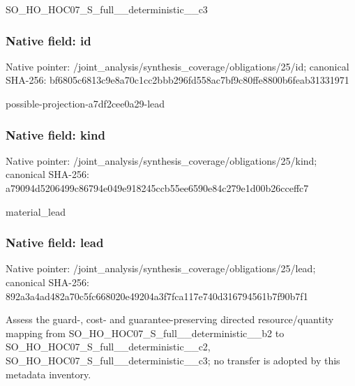 \documentclass[10pt,a4paper]{article}
\begin{document}
\begingroup\raggedright\sloppy SO\_\allowbreak{}HO\_\allowbreak{}HOC07\_\allowbreak{}S\_\allowbreak{}full\_\allowbreak{}\_\allowbreak{}deterministic\_\allowbreak{}\_\allowbreak{}c3\par\endgroup

\subsubsection{Native field: id}
Native pointer: /joint\_\allowbreak{}analysis/synthesis\_\allowbreak{}coverage/obligations/25/id; canonical SHA-256: bf6805c6813c9e8a70c1cc2bbb296fd558ac7bf9c80ffe8800b6feab31331971

\begingroup\raggedright\sloppy possible-projection-a7df2cee0a29-lead\par\endgroup

\subsubsection{Native field: kind}
Native pointer: /joint\_\allowbreak{}analysis/synthesis\_\allowbreak{}coverage/obligations/25/kind; canonical SHA-256: a79094d5206499c86794e049e918245ccb55ee6590e84c279e1d00b26cceffc7

\begingroup\raggedright\sloppy material\_\allowbreak{}lead\par\endgroup

\subsubsection{Native field: lead}
Native pointer: /joint\_\allowbreak{}analysis/synthesis\_\allowbreak{}coverage/obligations/25/lead; canonical SHA-256: 892a3a4ad482a70c5fc668020e49204a3f7fca117e740d316794561b7f90b7f1

\begingroup\raggedright\sloppy Assess the guard-,\allowbreak{} cost- and guarantee-preserving directed resource/\allowbreak{}quantity mapping from SO\_\allowbreak{}HO\_\allowbreak{}HOC07\_\allowbreak{}S\_\allowbreak{}full\_\allowbreak{}\_\allowbreak{}deterministic\_\allowbreak{}\_\allowbreak{}b2 to SO\_\allowbreak{}HO\_\allowbreak{}HOC07\_\allowbreak{}S\_\allowbreak{}full\_\allowbreak{}\_\allowbreak{}deterministic\_\allowbreak{}\_\allowbreak{}c2,\allowbreak{} SO\_\allowbreak{}HO\_\allowbreak{}HOC07\_\allowbreak{}S\_\allowbreak{}full\_\allowbreak{}\_\allowbreak{}deterministic\_\allowbreak{}\_\allowbreak{}c3;\allowbreak{} no transfer is adopted by this metadata inventory.\par\endgroup
\end{document}
